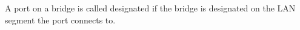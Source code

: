 A port on a bridge is called designated if the bridge is designated on the LAN segment the port connects to.